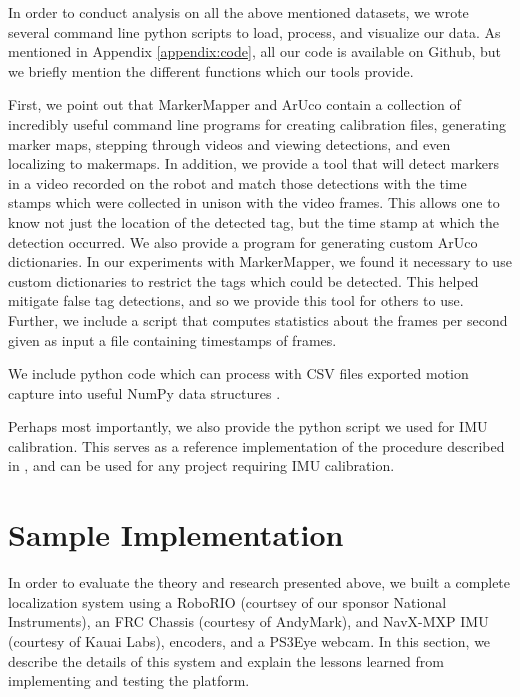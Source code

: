 \documentclass{article}
\begin{document}
    In order to conduct analysis on all the above mentioned datasets, we wrote several command line python scripts to load, process, and visualize our data. As mentioned in Appendix \ref{appendix:code}, all our code is available on Github, but we briefly mention the different functions which our tools provide.

    First, we point out that MarkerMapper and ArUco contain a collection of incredibly useful command line programs for creating calibration files, generating marker maps, stepping through videos and viewing detections, and even localizing to makermaps. In addition, we provide a tool that will detect markers in a video recorded on the robot and match those detections with the time stamps which were collected in unison with the video frames. This allows one to know not just the location of the detected tag, but the time stamp at which the detection occurred. We also provide a program for generating custom ArUco dictionaries. In our experiments with MarkerMapper, we found it necessary to use custom dictionaries to restrict the tags which could be detected. This helped mitigate false tag detections, and so we provide this tool for others to use. Further, we include a script that computes statistics about the frames per second given as input a file containing timestamps of frames.

    We include python code which can process with CSV files exported motion capture into useful NumPy data structures \cite{jones_scipy.org_2001}.

    Perhaps most importantly, we also provide the python script we used for IMU calibration. This serves as a reference implementation of the procedure described in \cite{tedaldi_robust_2014}, and can be used for any project requiring IMU calibration.




\section{Sample Implementation} \label{section:specs}

  In order to evaluate the theory and research presented above, we built a complete localization system using a RoboRIO (courtsey of our sponsor National Instruments), an FRC Chassis (courtesy of AndyMark), and NavX-MXP IMU (courtesy of Kauai Labs), encoders, and a PS3Eye webcam. In this section, we describe the details of this system and explain the lessons learned from implementing and testing the platform.
\end{document}
